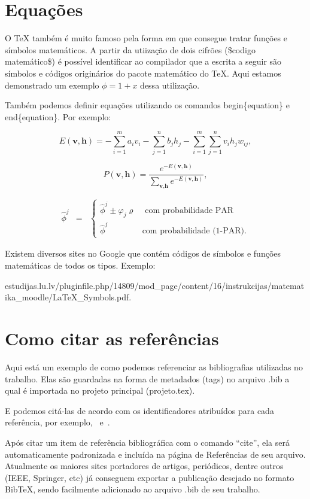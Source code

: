 \section{Equações}
\label{s.equacoes}

O TeX também é muito famoso pela forma em que consegue tratar funções e símbolos matemáticos. A partir da utiização de dois cifrões (\$codigo matemático\$) é possível identificar ao compilador que a escrita a seguir são símbolos e códigos originários do pacote matemático do TeX. Aqui estamos demonstrado um exemplo $\phi = 1 + x$ dessa utilização.

Também podemos definir equações utilizando os comandos begin\{equation\} e end\{equation\}. Por exemplo:

\begin{equation}
\label{e.energy_rbm}
E(\textbf{v},\textbf{h})=-\sum_{i=1}^ma_iv_i-\sum_{j=1}^nb_jh_j-\sum_{i=1}^m\sum_{j=1}^nv_ih_jw_{ij},
\end{equation}

\begin{equation}
\label{e.probability_configuration}
P(\textbf{v},\textbf{h})=\frac{e^{-E(\textbf{v},\textbf{h})}}{\displaystyle\sum_{\textbf{v},\textbf{h}}e^{-E(\textbf{v},\textbf{h})}},
\end{equation}

\begin{eqnarray}
\label{eq:par}
\hat{\phi}^j & = & \left\{ \begin{array}{ll} \hat{\phi}^j\pm \varphi_j \varrho  & \mbox{{ com probabilidade PAR}} \\
\hat{\phi}^j & \mbox{{com probabilidade (1-PAR).}}
\end{array}\right.
\end{eqnarray}

Existem diversos sites no Google que contém códigos de símbolos e funções matemáticas de todos os tipos. Exemplo:\\
\begin{center}
	\tiny estudijas.lu.lv/pluginfile.php/14809/mod\_page/content/16/instrukcijas/matematika\_moodle/LaTeX\_Symbols.pdf.
\end{center}

\section{Como citar as referências}
\label{ss.referencias}

Aqui está um exemplo de como podemos referenciar as bibliografias utilizadas no trabalho. Elas são guardadas na forma de metadados (tags) no arquivo .bib a qual é importada no projeto principal (projeto.tex).

E podemos citá-las de acordo com os identificadores atribuídos para cada referência, por exemplo,~\cite{stonebraker93} e~\cite{rocha09}.

Após citar um item de referência bibliográfica com o comando ``cite'', ela será automaticamente padronizada e incluída na página de Referências de seu arquivo. Atualmente os maiores sites portadores de artigos, periódicos, dentre outros (IEEE, Springer, etc) já conseguem exportar a publicação desejado no formato BibTeX, sendo facilmente adicionado ao arquivo .bib de seu trabalho.

